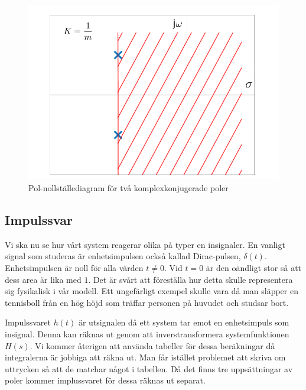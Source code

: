 \begin{figure}[H] 
    \centering
    \includegraphics[scale=0.33]{bilder/pol_nollstallediagram_komplexa_poler}
    \caption{Pol-nollställediagram för två komplexkonjugerade poler}
    \label{fig:pol_nollstallediagram_komplexa_poler}
\end{figure}
 
\newpage
\subsection{Impulssvar}
Vi ska nu se hur vårt system reagerar olika på typer en insignaler. En vanligt signal som studeras är enhetsimpulsen också kallad Dirac-pulsen, $\delta(t)$. 
Enhetsimpulsen är noll för alla värden $t\ne 0$. Vid $t = 0$ är den oändligt stor så att dess area är lika med $1$. Det är svårt att föreställa hur detta skulle representera sig fysikalisk i vår modell. Ett ungefärligt exempel skulle vara då man släpper en tennisboll från en hög höjd som träffar personen på huvudet och studsar bort. 

Impulssvaret $h(t)$ är utsignalen då ett system tar emot en enhetsimpuls som insignal. Denna kan räknas ut genom att inverstransformera systemfunktionen $H(s)$. Vi kommer återigen att använda tabeller för dessa beräkningar då integralerna är jobbiga att räkna ut. Man får istället problemet att skriva om uttrycken så att de matchar något i tabellen. Då det finns tre uppsättningar av poler kommer implussvaret för dessa räknas ut separat.

